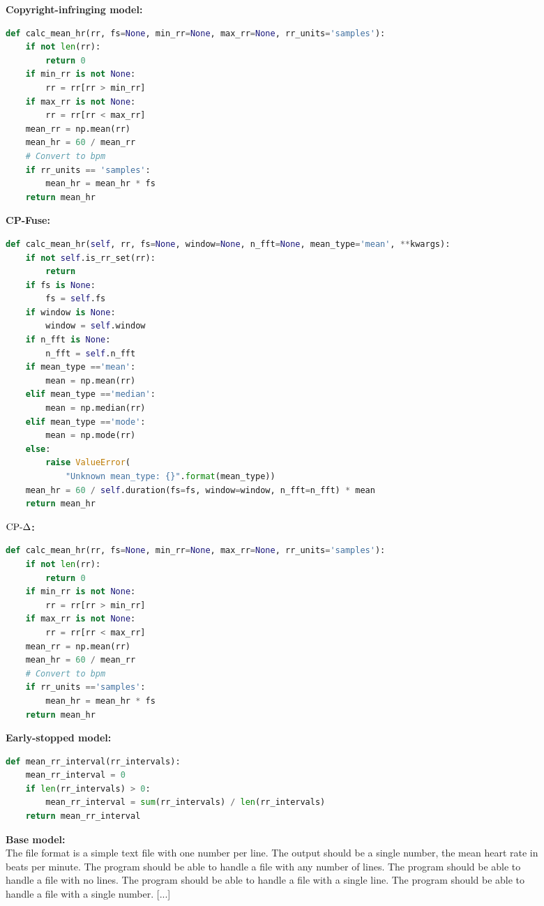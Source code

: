 \begin{figure}[!htbp]
    \centering
    \begin{promptmdfthree}
        \textbf{Copyright-infringing model:}
    \begin{lstlisting}[style=mystyle, language=Python]
def calc_mean_hr(rr, fs=None, min_rr=None, max_rr=None, rr_units='samples'):
    if not len(rr):
        return 0
    if min_rr is not None:
        rr = rr[rr > min_rr]
    if max_rr is not None:
        rr = rr[rr < max_rr]
    mean_rr = np.mean(rr)
    mean_hr = 60 / mean_rr
    # Convert to bpm
    if rr_units == 'samples':
        mean_hr = mean_hr * fs
    return mean_hr
        \end{lstlisting}
        \textbf{CP-Fuse:}
        \begin{lstlisting}[style=mystyle, language=Python]
def calc_mean_hr(self, rr, fs=None, window=None, n_fft=None, mean_type='mean', **kwargs):
    if not self.is_rr_set(rr):
        return
    if fs is None:
        fs = self.fs
    if window is None:
        window = self.window
    if n_fft is None:
        n_fft = self.n_fft
    if mean_type =='mean':
        mean = np.mean(rr)
    elif mean_type =='median':
        mean = np.median(rr)
    elif mean_type =='mode':
        mean = np.mode(rr)
    else:
        raise ValueError(
            "Unknown mean_type: {}".format(mean_type))
    mean_hr = 60 / self.duration(fs=fs, window=window, n_fft=n_fft) * mean
    return mean_hr
        \end{lstlisting}
        \textbf{$\text{CP-}\Delta$:}
        \begin{lstlisting}[style=mystyle, language=Python]
def calc_mean_hr(rr, fs=None, min_rr=None, max_rr=None, rr_units='samples'):
    if not len(rr):
        return 0
    if min_rr is not None:
        rr = rr[rr > min_rr]
    if max_rr is not None:
        rr = rr[rr < max_rr]
    mean_rr = np.mean(rr)
    mean_hr = 60 / mean_rr
    # Convert to bpm
    if rr_units =='samples':
        mean_hr = mean_hr * fs
    return mean_hr
        \end{lstlisting}
        \textbf{Early-stopped model:}
                \begin{lstlisting}[style=mystyle, language=Python]
def mean_rr_interval(rr_intervals):
    mean_rr_interval = 0
    if len(rr_intervals) > 0:
        mean_rr_interval = sum(rr_intervals) / len(rr_intervals)
    return mean_rr_interval
        \end{lstlisting}
        \textbf{Base model:}\\ 
            The file format is a simple text file with one number per line.  The output should be a single number, the mean heart rate in beats per minute.  The program should be able to handle a file with any number of lines.  The program should be able to handle a file with no lines.  The program should be able to handle a file with a single line.  The program should be able to handle a file with a single number. [...]

\end{promptmdfthree}
\end{figure}
